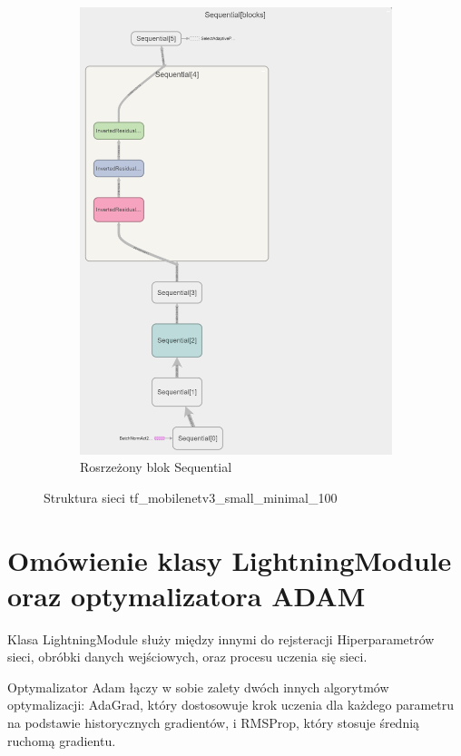 \documentclass[12pt,twoside]{article}
\begin{document}
\begin{figure}[ht]
\begin{subfigure}[b]{0.4\textwidth}
	  \includegraphics[width=\textwidth]{figures/v3_seq.png}
	  \caption{Rosrzeżony blok Sequential  }
	  \label{fig:obraz2}
	\end{subfigure}
	\caption{Struktura sieci tf\_mobilenetv3\_small\_minimal\_100}
	
\end{figure}

\clearpage

\section{Omówienie klasy LightningModule oraz optymalizatora ADAM}
Klasa LightningModule służy między innymi do rejsteracji Hiperparametrów sieci, obróbki danych wejściowych, oraz procesu uczenia się sieci.

Optymalizator Adam łączy w sobie zalety dwóch innych algorytmów optymalizacji: AdaGrad, który dostosowuje krok uczenia dla każdego parametru na podstawie historycznych gradientów, i RMSProp, który stosuje średnią ruchomą gradientu.
\end{document}
